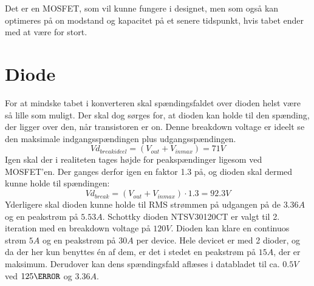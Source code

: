 Det er en MOSFET, som vil kunne fungere i designet, men som også kan optimeres på on modstand og kapacitet på et senere tidspunkt, hvis tabet ender med at være for stort. 

\section{Diode}
For at mindske tabet i konverteren skal spændingsfaldet over dioden helst være så lille som muligt. Der skal dog sørges for, at dioden kan holde til den spænding, der ligger over den, når transistoren er on. Denne breakdown voltage er ideelt se den maksimale indgangsspændingen plus udgangsspændingen.
\begin{equation} \label{Vd_breakideel}
Vd_{breakideel} = (V_{out}+V_{inmax}) = 71V
\end{equation}
Igen skal der i realiteten tages højde for peakspændinger ligesom ved MOSFET'en. Der ganges derfor igen en faktor 1.3 på, og dioden skal dermed kunne holde til spændingen:
\begin{equation} \label{Vd_break}
Vd_{break} = (V_{out}+V_{inmax}) \cdot 1.3 = 92.3V
\end{equation}
Yderligere skal dioden kunne holde til RMS strømmen på udgangen på de $3.36A$ og en peakstrøm på $5.53A$.
Schottky dioden NTSV30120CT er valgt til 2. iteration med en breakdown voltage på $120V$. Dioden kan klare en continuos strøm $5A$ og en peakstrøm på $30A$ per device. Hele devicet er med 2 dioder, og da der her kun benyttes én af dem, er det i stedet en peakstrøm på $15A$, der er maksimum. Derudover kan dens spændingsfald aflæses i databladet til ca. $0.5V$ ved $125\degreeCelsius$ og $3.36A$. 

